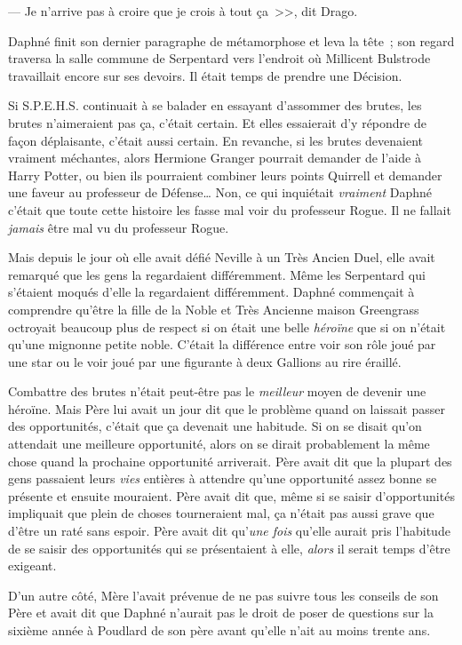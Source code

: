 --- Je n'arrive pas à croire que je crois à tout ça~>>, dit Drago.

\later

Daphné finit son dernier paragraphe de métamorphose et leva la tête~; son regard traversa la salle commune de Serpentard vers l'endroit où Millicent Bulstrode travaillait encore sur ses devoirs. Il était temps de prendre une Décision.

Si S.P.E.H.S. continuait à se balader en essayant d'assommer des brutes, les brutes n'aimeraient pas ça, c'était certain. Et elles essaierait d'y répondre de façon déplaisante, c'était aussi certain. En revanche, si les brutes devenaient vraiment méchantes, alors Hermione Granger pourrait demander de l'aide à Harry Potter, ou bien ils pourraient combiner leurs points Quirrell et demander une faveur au professeur de Défense… Non, ce qui inquiétait \emph{vraiment} Daphné c'était que toute cette histoire les fasse mal voir du professeur Rogue. Il ne fallait \emph{jamais} être mal vu du professeur Rogue.

Mais depuis le jour où elle avait défié Neville à un Très Ancien Duel, elle avait remarqué que les gens la regardaient différemment. Même les Serpentard qui s'étaient moqués d'elle la regardaient différemment. Daphné commençait à comprendre qu'être la fille de la Noble et Très Ancienne maison Greengrass octroyait beaucoup plus de respect si on était une belle \emph{héroïne} que si on n'était qu'une mignonne petite noble. C'était la différence entre voir son rôle joué par une star ou le voir joué par une figurante à deux Gallions au rire éraillé.

Combattre des brutes n'était peut-être pas le \emph{meilleur} moyen de devenir une héroïne. Mais Père lui avait un jour dit que le problème quand on laissait passer des opportunités, c'était que ça devenait une habitude. Si on se disait qu'on attendait une meilleure opportunité, alors on se dirait probablement la même chose quand la prochaine opportunité arriverait. Père avait dit que la plupart des gens passaient leurs \emph{vies} entières à attendre qu'une opportunité assez bonne se présente et ensuite mouraient. Père avait dit que, même si se saisir d'opportunités impliquait que plein de choses tourneraient mal, ça n'était pas aussi grave que d'être un raté sans espoir. Père avait dit qu'\emph{une fois} qu'elle aurait pris l'habitude de se saisir des opportunités qui se présentaient à elle, \emph{alors} il serait temps d'être exigeant.

D'un autre côté, Mère l'avait prévenue de ne pas suivre tous les conseils de son Père et avait dit que Daphné n'aurait pas le droit de poser de questions sur la sixième année à Poudlard de son père avant qu'elle n'ait au moins trente ans.

